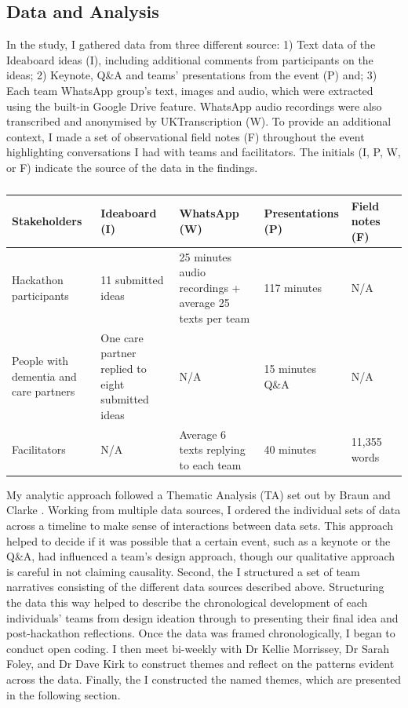 \subsection{Data and Analysis}
\label{sec:DataAnalysis}
In the study, I gathered data from three different source: 1) Text data of the Ideaboard ideas (I), including additional comments from participants on the ideas; 2) Keynote, Q\&A and teams’ presentations from the event (P) and; 3) Each team WhatsApp group’s text, images and audio, which were extracted using the built-in Google Drive feature. WhatsApp audio recordings were also transcribed and anonymised by UKTranscription (W). To provide an additional context, I made a set of observational field notes (F) throughout the event highlighting conversations I had with teams and facilitators. The initials (I, P, W, or F) indicate the source of the data in the findings.

\begin{table}[ht]
\caption{}
\label{table:data collection}
\begin{tabularx}{\textwidth}{@{} Y|YYYYY @{}}
\textbf{Stakeholders} & \textbf{Ideaboard (I)} & \textbf{WhatsApp (W)} & \textbf{Presentations (P)} & \textbf{Field notes (F)} \\ \hline
Hackathon participants & 11 submitted ideas & 25 minutes audio recordings + average 25 texts per team & 117 minutes & N/A \\
People with dementia and care partners & One care partner replied to eight submitted ideas & N/A & 15 minutes Q\&A & N/A \\
Facilitators & N/A & Average 6 texts replying to each team & 40 minutes & 11,355 words \\
\end{tabularx}
\end{table}
My analytic approach followed a Thematic Analysis (TA) set out by Braun and Clarke \citep{braun_one_2020,braun_using_2006}. Working from multiple data sources, I ordered the individual sets of data across a timeline to make sense of interactions between data sets. This approach helped to decide if it was possible that a certain event, such as a keynote or the Q\&A, had influenced a team's design approach, though our qualitative approach is careful in not claiming causality. Second, the I structured a set of team narratives consisting of the different data sources described above. Structuring the data this way helped to describe the chronological development of each individuals’ teams from design ideation through to presenting their final idea and post-hackathon reflections.  Once the data was framed chronologically, I began to conduct open coding. I then meet bi-weekly with Dr Kellie Morrissey, Dr Sarah Foley, and Dr Dave Kirk to construct themes and reflect on the patterns evident across the data. Finally, the I constructed the named themes, which are presented in the following section. 
